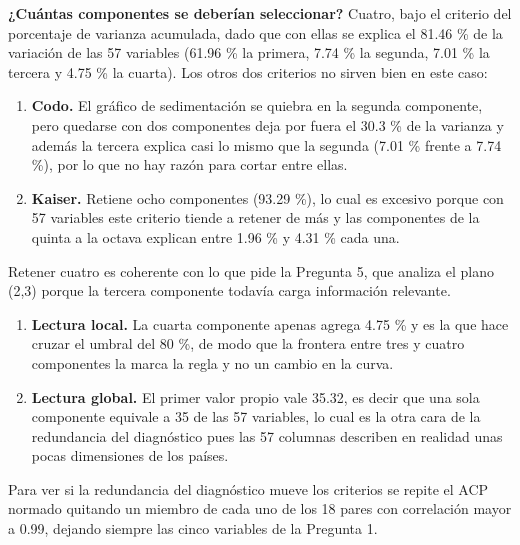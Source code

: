 \documentclass[oneside, openany, fontset=libertinus]{mitthesis}
\providecommand{\tightlist}{\setlength{\itemsep}{0pt}\setlength{\parskip}{0pt}}
\begin{document}
\textbf{¿Cuántas componentes se deberían seleccionar?} Cuatro, bajo el
criterio del porcentaje de varianza acumulada, dado que con ellas se
explica el 81.46 \% de la variación de las 57 variables (61.96 \% la
primera, 7.74 \% la segunda, 7.01 \% la tercera y 4.75 \% la cuarta).
Los otros dos criterios no sirven bien en este caso:

\begin{enumerate}
\def\labelenumi{\alph{enumi}.}
\tightlist
\item
  \textbf{Codo.} El gráfico de sedimentación se quiebra en la segunda
  componente, pero quedarse con dos componentes deja por fuera el 30.3
  \% de la varianza y además la tercera explica casi lo mismo que la
  segunda (7.01 \% frente a 7.74 \%), por lo que no hay razón para
  cortar entre ellas.
\item
  \textbf{Kaiser.} Retiene ocho componentes (93.29 \%), lo cual es
  excesivo porque con 57 variables este criterio tiende a retener de más
  y las componentes de la quinta a la octava explican entre 1.96 \% y
  4.31 \% cada una.
\end{enumerate}

Retener cuatro es coherente con lo que pide la Pregunta 5, que analiza
el plano (2,3) porque la tercera componente todavía carga información
relevante.

\begin{enumerate}
\def\labelenumi{\alph{enumi}.}
\tightlist
\item
  \textbf{Lectura local.} La cuarta componente apenas agrega 4.75 \% y
  es la que hace cruzar el umbral del 80 \%, de modo que la frontera
  entre tres y cuatro componentes la marca la regla y no un cambio en la
  curva.
\item
  \textbf{Lectura global.} El primer valor propio vale 35.32, es decir
  que una sola componente equivale a 35 de las 57 variables, lo cual es
  la otra cara de la redundancia del diagnóstico pues las 57 columnas
  describen en realidad unas pocas dimensiones de los países.
\end{enumerate}

Para ver si la redundancia del diagnóstico mueve los criterios se repite
el ACP normado quitando un miembro de cada uno de los 18 pares con
correlación mayor a 0.99, dejando siempre las cinco variables de la
Pregunta 1.

\Needspace{1.33in}
\end{document}
